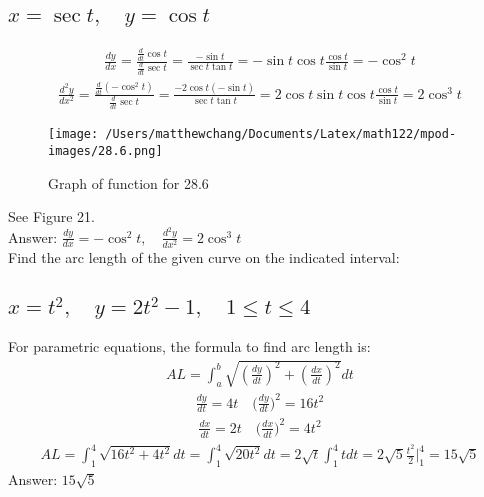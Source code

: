 \documentclass{article}
\begin{document}
\subsection{$x = \sec{t}, \quad y = \cos{t}$}
\begin{align*}
	\frac{dy}{dx} = \frac{\frac{d}{dt}\cos{t}}{\frac{d}{dt}\sec{t}} = \frac{-\sin{t}}{\sec{t} \tan{t}} = -\sin{t} \cos{t} \frac{\cos{t}}{\sin{t}} = -\cos^2{t}
\end{align*}
\begin{align*}
	\frac{d^2 y}{dx^2} = \frac{\frac{d}{dt} (-\cos^2{t})}{\frac{d}{dt} \sec{t}} = \frac{-2 \cos{t} (-\sin{t})}{\sec{t} \tan{t}} = 2\cos{t} \sin{t} \cos{t} \frac{\cos{t}}{\sin{t}} = 2 \cos^3{t}
\end{align*}
\begin{figure}
	\centering
	\texttt{[image: /Users/matthewchang/Documents/Latex/math122/mpod-images/28.6.png]}
	\caption{Graph of function for 28.6}
\end{figure}
See Figure 21. \\[10pt]
Answer: $\frac{dy}{dx} = -\cos^2{t}, \quad \frac{d^2 y}{dx^2} = 2\cos^3{t}$
\\[10pt]
Find the arc length of the given curve on the indicated interval:

\subsection{$x = t^2, \quad y = 2t^2 - 1, \quad 1 \leq t \leq 4$}
For parametric equations, the formula to find arc length is:
\begin{align*}
	AL = \int_a^b {\sqrt{(\frac{dy}{dt})^2 + (\frac{dx}{dt})^2} dt}
\end{align*}
\begin{align*}
	\frac{dy}{dt} = 4t \quad \bigg( \frac{dy}{dt} \bigg)^2 = 16t^2
\end{align*}
\begin{align*}
	\frac{dx}{dt} = 2t \quad \bigg( \frac{dx}{dt} \bigg)^2 = 4t^2
\end{align*}
\begin{align*}
	AL = \int_1^4 {\sqrt{16t^2 + 4t^2}dt} = \int_1^4 {\sqrt{20t^2}dt} = 2\sqrt{t} \int_1^4 {t dt} = 2\sqrt{5} \frac{t^2}{2} \bigg|_1^4 = 15\sqrt{5}
\end{align*}
Answer: $15\sqrt{5}$

\end{document}
